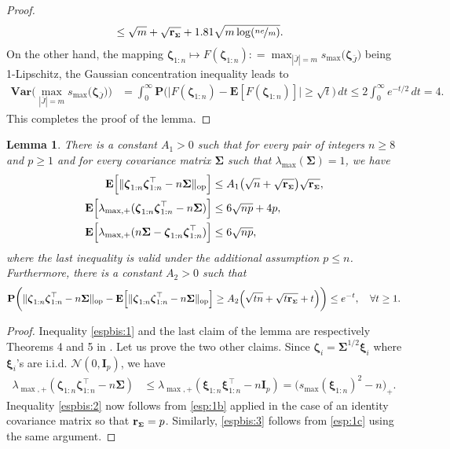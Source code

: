 \documentclass[aos,preprint,reqno]{imsart}
\newcommand\bxi{\boldsymbol\xi}
\newcommand\bzeta{\boldsymbol\zeta}
\newcommand\bSigma{\boldsymbol\Sigma}
\newcommand\bfE{\mathbf E}
\newcommand\bfP{\mathbf P}
\newcommand\bfI{\mathbf I}
\newcommand\rSigma{\textbf{\textup{r}}_{\scriptscriptstyle\bSigma}}
\theoremstyle{plain}
\newtheorem{lemma}{Lemma}
\theoremstyle{remark}
\begin{document}
\begin{proof}
\begin{align}
			&\le \sqrt{m} + \sqrt{\rSigma} +  1.81\sqrt{m \log(\nicefrac{ne}{m})}.		
	\end{align}
	On the other hand, the mapping $\bzeta_{1:n}\mapsto F(\bzeta_{1:n}) : = 
	\max_{|\bar J| = m}s_{\max}\big(\bzeta_{\bar J}\big)$ being 1-Lipschitz, the 
	Gaussian concentration inequality leads to
	\begin{align}
		\textbf{Var} \Big(\max_{|\bar J| = m}s_{\max}\big(\bzeta_{\bar J}\big)\Big)
			& = \int_0^\infty \textbf{P} \Big(\big|F(\bzeta_{1:n})-\bfE
			[F(\bzeta_{1:n})]\big|\ge\sqrt{t}\Big)\,dt\le 2\int_0^\infty e^{-t/2}\,dt 
			= 4.
	\end{align}
	This completes the proof of the lemma.
	\end{proof}

	\begin{lemma} \label{lem:smaxbis}
	There is a constant $A_1>0$ such that for every pair of integers  $n\ge 8$ 
	and $p\ge 1$ and for every covariance matrix $\bSigma$ such that 
	$\lambda_{\max}(\bSigma) = 1$, we have
	\begin{align}
		\bfE\Big[\|\bzeta_{1:n}\bzeta_{1:n}^\top-n\bSigma\|_{\textup{op}}\Big] 
		&\le  A_1\big(\sqrt{n} 
			+ \sqrt{\rSigma}\big)\sqrt{\rSigma},\label{espbis:1}\\
		\bfE\Big[\lambda_{\max,+}(\bzeta_{1:n}\bzeta_{1:n}^\top-n\bSigma)\Big] 
		&\le  6\sqrt{np} + 4p,\label{espbis:2}\\
		\bfE\Big[\lambda_{\max,+}(n\bSigma - \bzeta_{1:n}\bzeta_{1:n}^\top)\Big] 
		&\le  6\sqrt{np},\label{espbis:3}
	\end{align}	
	where the last inequality is valid under the additional assumption $p\le n$. 
	Furthermore, there is a constant $A_2>0$ such that 
	\begin{align}
		\bfP\bigg(\|\bzeta_{1:n}\bzeta_{1:n}^\top-n\bSigma\|_{\textup{op}} -
		\bfE\Big[\|\bzeta_{1:n}\bzeta_{1:n}^\top-n\bSigma\|_{\textup{op}}\Big] 
		\ge A_2\Big(\sqrt{tn} + \sqrt{t\rSigma}+t\Big)\bigg)\le e^{-t},\quad \forall t\ge 1.
	\end{align}
	\end{lemma} 
	\begin{proof}
	Inequality \eqref{espbis:1} and the last claim of the lemma are respectively 
	Theorems 4 and 5 in \citep{KoltchLounici}. Let us prove the two other claims. 
	Since $\bzeta_i = \bSigma^{1/2}\bxi_i$ where $\bxi_i$'s are i.i.d. $\mathcal N(0,\bfI_p)$, 
	we have
	\begin{align}
		\lambda_{\max,+}(\bzeta_{1:n}\bzeta_{1:n}^\top-n\bSigma)
		&\le \lambda_{\max,+}(\bxi_{1:n}\bxi_{1:n}^\top-n\bfI_p)
		 = \big(s_{\max}(\bxi_{1:n})^2 - n\big)_+.
	\end{align}
	Inequality \eqref{espbis:2} now follows from \eqref{esp:1b}	applied in the
	case of an identity covariance matrix so that $\rSigma = p$. Similarly, 
	\eqref{espbis:3}  follows from \eqref{esp:1c} using the same argument.
	\end{proof}
\end{document}

